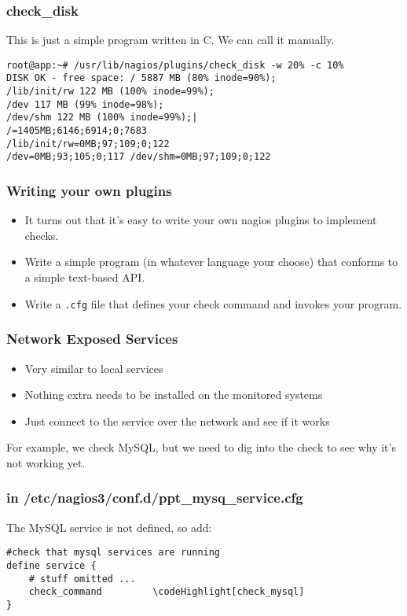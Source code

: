 \documentclass[10pt]{beamer}
\newcommand\codeHighlight[1]{\textcolor[rgb]{1,0,0}{\textbf{#1}}}
\begin{document}
\begin{frame}[fragile]
  \frametitle{check\_disk}

  This is just a simple program written in C.  We can call it manually.
\begin{Verbatim}[commandchars=\\\[\]]
root@app:~# /usr/lib/nagios/plugins/check_disk -w 20% -c 10%
DISK OK - free space: / 5887 MB (80% inode=90%);
/lib/init/rw 122 MB (100% inode=99%);
/dev 117 MB (99% inode=98%);
/dev/shm 122 MB (100% inode=99%);|
/=1405MB;6146;6914;0;7683
/lib/init/rw=0MB;97;109;0;122
/dev=0MB;93;105;0;117 /dev/shm=0MB;97;109;0;122
\end{Verbatim}
\end{frame}


\begin{frame}
  \frametitle{Writing your own plugins}


\begin{itemize}
  \item It turns out that it's easy to write your own nagios plugins to 
	  implement checks.
  \item Write a simple program (in whatever language your choose) that 
	  conforms to a simple text-based API.
  \item Write a \texttt{.cfg} file that defines your check command and invokes
		  your program.
\end{itemize}


\end{frame}
\begin{frame}
  \frametitle{Network Exposed Services}


\begin{itemize}
  \item Very similar to local services
  \item Nothing extra needs to be installed on the monitored systems
  \item Just connect to the service over the network and see if it works
\end{itemize}

For example, we check MySQL, but we need to dig into the check to see why
it's not working yet.

\end{frame}

\begin{frame}[fragile]
  \frametitle{in /etc/nagios3/conf.d/ppt\_mysq\_service.cfg}

The MySQL service is not defined, so add:
\begin{Verbatim}[commandchars=\\\[\]]
#check that mysql services are running
define service {
    # stuff omitted ...
    check_command         \codeHighlight[check_mysql]
}

\end{Verbatim}
\end{frame}
\end{document}
